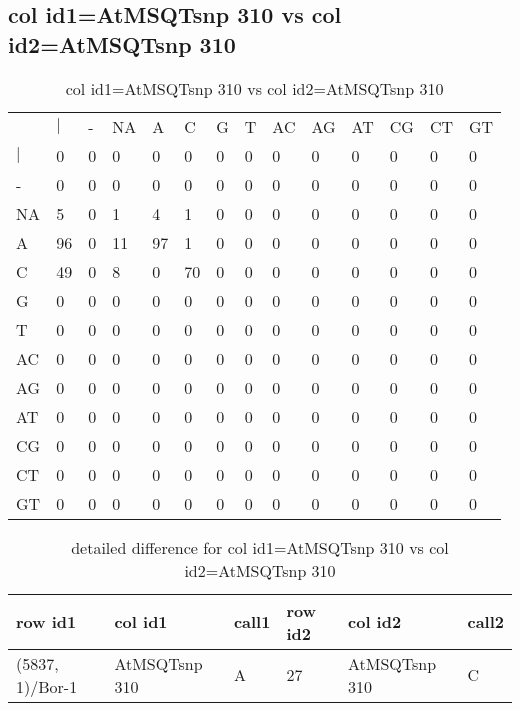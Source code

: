 \subsection{col id1=AtMSQTsnp 310 vs col id2=AtMSQTsnp 310}
\begin{center}
\begin{longtable}{|l|l|l|l|l|l|l|l|l|l|l|l|l|l|}
\caption{col id1=AtMSQTsnp 310 vs col id2=AtMSQTsnp 310} \label{table_dm850}\\
\hline
\\
\hline
&$|$&-&NA&A&C&G&T&AC&AG&AT&CG&CT&GT\\
$|$&0&0&0&0&0&0&0&0&0&0&0&0&0\\
-&0&0&0&0&0&0&0&0&0&0&0&0&0\\
NA&5&0&1&4&1&0&0&0&0&0&0&0&0\\
A&96&0&11&97&1&0&0&0&0&0&0&0&0\\
C&49&0&8&0&70&0&0&0&0&0&0&0&0\\
G&0&0&0&0&0&0&0&0&0&0&0&0&0\\
T&0&0&0&0&0&0&0&0&0&0&0&0&0\\
AC&0&0&0&0&0&0&0&0&0&0&0&0&0\\
AG&0&0&0&0&0&0&0&0&0&0&0&0&0\\
AT&0&0&0&0&0&0&0&0&0&0&0&0&0\\
CG&0&0&0&0&0&0&0&0&0&0&0&0&0\\
CT&0&0&0&0&0&0&0&0&0&0&0&0&0\\
GT&0&0&0&0&0&0&0&0&0&0&0&0&0\\
\hline
\end{longtable}
\end{center}

\begin{center}
\begin{longtable}{|l|l|l|l|l|l|}
\caption{detailed difference for col id1=AtMSQTsnp 310 vs col id2=AtMSQTsnp 310} \label{table_dm851}\\
\hline
row id1&col id1&call1&row id2&col id2&call2\\
\hline
(5837, 1)/Bor-1&AtMSQTsnp 310&A&27&AtMSQTsnp 310&C\\
\hline
\end{longtable}
\end{center}

